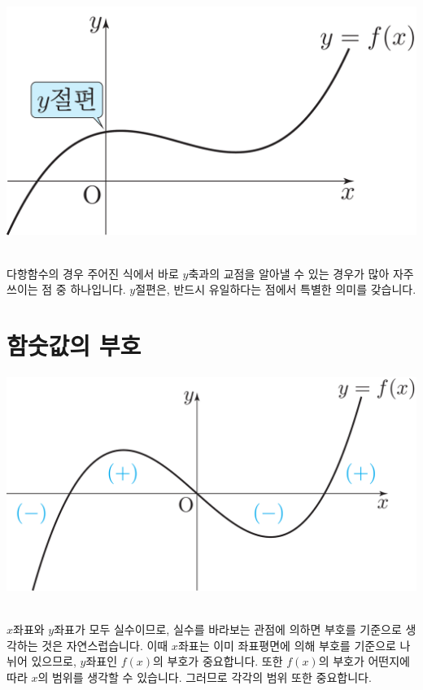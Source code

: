 \begin{center} \includegraphics[scale=\pgfkeysvalueof{picsize}]{DBs/pic/zery_13.pdf}\
	\end{center}다항함수의 경우 주어진 식에서 바로 $y$축과의 교점을 알아낼 수 있는 경우가 많아 자주 쓰이는 점 중 하나입니다. $y$절편은, 반드시 유일하다는 점에서 특별한 의미를 갖습니다. 

\section{함숫값의 부호}
\begin{center} \includegraphics[scale=\pgfkeysvalueof{picsize}]{DBs/pic/zery_14.pdf}\
	\end{center}$x$좌표와 $y$좌표가 모두 실수이므로, 실수를 바라보는 관점에 의하면 부호를 기준으로 생각하는 것은 자연스럽습니다. 이때 $x$좌표는 이미 좌표평면에 의해 부호를 기준으로 나뉘어 있으므로, $y$좌표인 $f\left( x \right) $의 부호가 중요합니다. 또한 $f\left( x \right) $의 부호가 어떤지에 따라 $x$의 범위를 생각할 수 있습니다. 그러므로 각각의 범위 또한 중요합니다.
\clearpage

